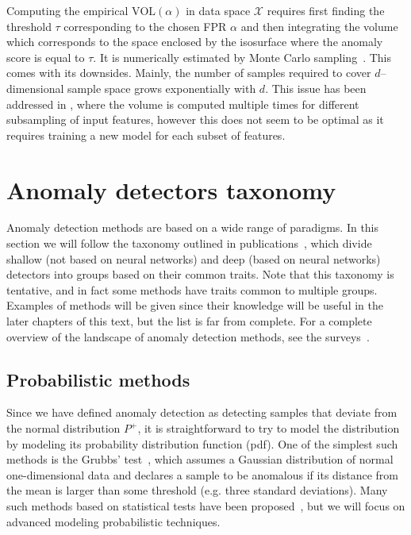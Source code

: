 Computing the empirical $\text{VOL}(\alpha)$ in data space $\mathcal{X}$ requires first finding the threshold $\tau$ corresponding to the chosen FPR $\alpha$ and then integrating the volume which corresponds to the space enclosed by the isosurface where the anomaly score is equal to $\tau$. It is numerically estimated by Monte Carlo sampling~\cite{robert1999monte}. This comes with its downsides. Mainly, the number of samples required to cover $d$--dimensional sample space grows exponentially with $d$. This issue has been addressed in \cite{goix2016evaluate}, where the volume is computed multiple times for different subsampling of input features, however this does not seem to be optimal as it requires training a new model for each subset of features.


\section{Anomaly detectors taxonomy} \label{sec:taxonomy}
Anomaly detection methods are based on a wide range of paradigms. In this section we will follow the taxonomy outlined in publications~\cite{pimentel2014review, ruff2020unifying}, which divide shallow (not based on neural networks) and deep (based on neural networks) detectors into groups based on their common traits. Note that this taxonomy is tentative, and in fact some methods have traits common to multiple groups. Examples of methods will be given since their knowledge will be useful in the later chapters of this text, but the list is far from complete. For a complete overview of the landscape of anomaly detection methods, see the surveys~\cite{pimentel2014review, campos2016evaluation, goldstein2016comparative, moustafa2019holistic, kwon2019survey, fernandes2019comprehensive, wang2019progress, chalapathy2019deep,ruff2020unifying}.

\subsection{Probabilistic  methods} \label{sec:probabilistic_models}
Since we have defined anomaly detection as detecting samples that deviate from the normal distribution $P^+$, it is straightforward to try to model the distribution by modeling its probability distribution function (pdf). One of the simplest such methods is the Grubbs' test~\cite{grubbs1969procedures}, which assumes a Gaussian distribution of normal one-dimensional data and declares a sample to be anomalous if its distance from the mean is larger than some threshold (e.g. three standard deviations). Many such methods based on statistical tests have been proposed~\cite{barnett1994outliers}, but we will focus on advanced modeling probabilistic techniques.

